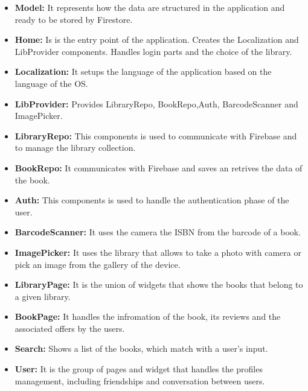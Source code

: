 \begin{itemize}
    \item
    \textbf{Model:} It represents how the data are structured in the application and ready to be stored by Firestore.
    \item
    \textbf{Home:} Is is the entry point of the application. Creates the Localization and LibProvider components. Handles login parts and the choice of the library.
    \item
    \textbf{Localization:} It setups the language of the application based on the language of the OS.
    \item
    \textbf{LibProvider:} Provides LibraryRepo, BookRepo,Auth, BarcodeScanner and ImagePicker.
    \item
    \textbf{LibraryRepo:} This components is used to communicate with Firebase and to manage the library collection.
    \item
    \textbf{BookRepo:} It communicates with Firebase and saves an retrives the data of the book.
    \item
    \textbf{Auth:} This components is used to handle the authentication phase of the user.
    \item
    \textbf{BarcodeScanner:} It uses the camera the ISBN from the barcode of a book.
    \item
    \textbf{ImagePicker:} It uses the library that allows to take a photo with camera or pick an image from the gallery of the device.
    \item
    \textbf{LibraryPage:} It is the union of widgets that shows the books that belong to a given library.
    \item
    \textbf{BookPage:} It handles the infromation of the book, its reviews and the associated offers by the users. 
    \item
    \textbf{Search:} Shows a list of the books, which match with a user's input.
    \item
    \textbf{User:} It is the group of pages and widget that handles the profiles management, including friendships and conversation between users.
\end{itemize}
\clearpage
